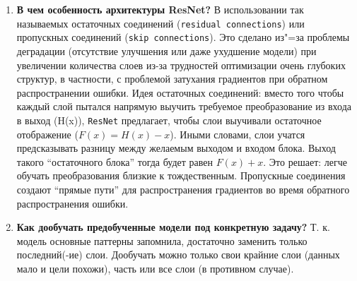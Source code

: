 \documentclass{article}
\begin{document}
\begin{enumerate}
    \item \textbf{В чем особенность архитектуры ResNet?} В использовании так называемых остаточных соединений (\texttt{residual connections}) или пропускных соединений (\texttt{skip connections}). Это сделано из"=за проблемы деградации (отсутствие улучшения или даже ухудшение модели) при увеличении количества слоев из-за трудностей оптимизации очень глубоких структур, в частности, с проблемой затухания градиентов при обратном распространении ошибки. Идея остаточных соединений: вместо того чтобы каждый слой пытался напрямую выучить требуемое преобразование из входа в выход (H(x)), \texttt{ResNet} предлагает, чтобы слои выучивали остаточное отображение ($F(x)=H(x)-x$). Иными словами, слои учатся предсказывать разницу между желаемым выходом и входом блока. Выход такого ``остаточного блока'' тогда будет равен $F(x) + x$. Это решает: легче обучать преобразования близкие к тождественным. Пропускные соединения создают ``прямые пути'' для распространения градиентов во время обратного распространения ошибки.
    \item \textbf{Как дообучать предобученные модели под конкретную задачу?} Т. к. модель основные паттерны запомнила, достаточно заменить только последний(-ие) слои. Дообучать можно только свои крайние слои (данных мало и цели похожи), часть или все слои (в противном случае).
\end{enumerate}
\end{document}
